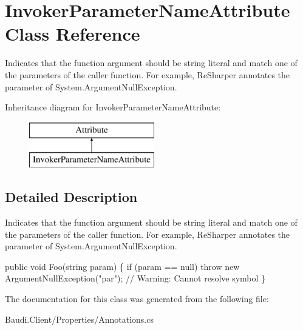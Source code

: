 \hypertarget{class_invoker_parameter_name_attribute}{}\section{Invoker\+Parameter\+Name\+Attribute Class Reference}
\label{class_invoker_parameter_name_attribute}


Indicates that the function argument should be string literal and match one of the parameters of the caller function. For example, Re\+Sharper annotates the parameter of System.\+Argument\+Null\+Exception.  


Inheritance diagram for Invoker\+Parameter\+Name\+Attribute\+:\begin{figure}[H]
\begin{center}
\leavevmode
\includegraphics[height=2.000000cm]{class_invoker_parameter_name_attribute}
\end{center}
\end{figure}


\subsection{Detailed Description}
Indicates that the function argument should be string literal and match one of the parameters of the caller function. For example, Re\+Sharper annotates the parameter of System.\+Argument\+Null\+Exception. 


\begin{DoxyCode}
\textcolor{keyword}{public} \textcolor{keywordtype}{void} Foo(\textcolor{keywordtype}{string} param) \{
  \textcolor{keywordflow}{if} (param == null)
    \textcolor{keywordflow}{throw} \textcolor{keyword}{new} ArgumentNullException(\textcolor{stringliteral}{"par"}); \textcolor{comment}{// Warning: Cannot resolve symbol}
\}
\end{DoxyCode}


The documentation for this class was generated from the following file\+:\begin{DoxyCompactItemize}
\item 
Baudi.\+Client/\+Properties/Annotations.\+cs\end{DoxyCompactItemize}
